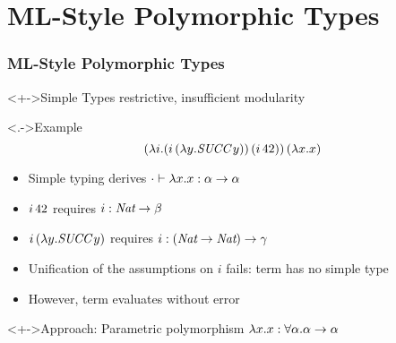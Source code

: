 \documentclass[pdftex,aspectratio=169]{beamer}
\subtitle
{Polymorphic Types}
\begin{document}
\begin{frame}
  \titlepage
\end{frame}



\section{ML-Style Polymorphic Types}
\begin{frame}
  \frametitle{ML-Style Polymorphic Types}
  \begin{block}<+->{Simple Types}
    restrictive, insufficient modularity
  \end{block}
  \begin{exampleblock}<.->{Example}
    \begin{displaymath}
      (\lambda i. (i\, (\lambda y.\textit{SUCC}\, y))\, (i\,42))\, (\lambda x.x)
    \end{displaymath}
    \VSPBLS
    \begin{itemize}
    \item Simple typing derives $\cdot \vdash \lambda x.x : \alpha\to\alpha$
    \item $i\,42$ requires $i : \textit{Nat} \to \beta$
    \item $i\, (\lambda y.\textit{SUCC}\, y)$ requires $i : (\textit{Nat}\to\textit{Nat}) \to \gamma$
    \item Unification of the assumptions on $i$ fails: term has no
      simple type
    \item However, term evaluates without error
    \end{itemize}
  \end{exampleblock}
  \begin{alertblock}<+->{Approach: Parametric polymorphism $\lambda x.x : \textcolor{black}{\forall \alpha}.\alpha\to\alpha$}
    
  \end{alertblock}
\end{frame}
\end{document}
